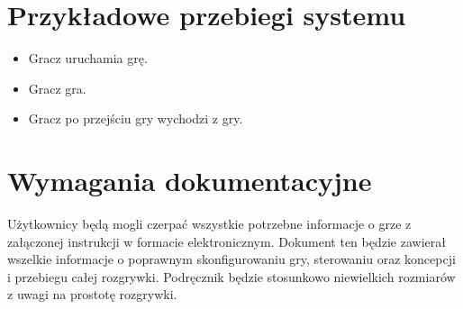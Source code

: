 \documentclass[12pt,a4paper,twoside]{article}
\begin{document}




\section{Przykładowe przebiegi systemu}
\begin{itemize}
\item Gracz uruchamia grę.
\item Gracz gra.
\item Gracz po przejściu gry wychodzi z gry.
\end{itemize}

\section{Wymagania dokumentacyjne}



Użytkownicy będą mogli czerpać wszystkie potrzebne informacje o grze z załączonej instrukcji w formacie elektronicznym. Dokument ten będzie zawierał wszelkie informacje o poprawnym skonfigurowaniu gry, sterowaniu oraz koncepcji i przebiegu całej rozgrywki. Podręcznik będzie stosunkowo niewielkich rozmiarów z uwagi na prostotę rozgrywki.
\end{document}
